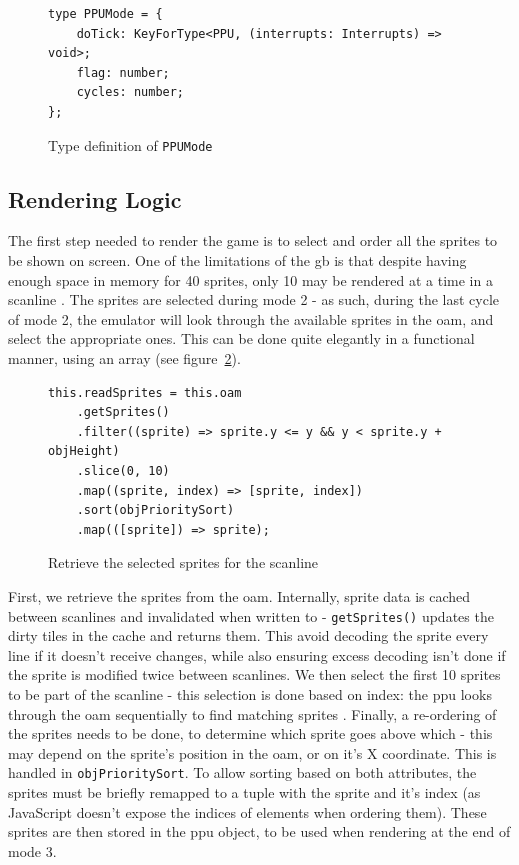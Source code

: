 \documentclass[11pt]{report}
\begin{document}
\begin{figure}[h]
    \begin{verbatim}
type PPUMode = {
    doTick: KeyForType<PPU, (interrupts: Interrupts) => void>;
    flag: number;
    cycles: number;
};
    \end{verbatim}
    \caption{Type definition of \texttt{PPUMode}}
    \label{fig:stat-mode-type}
\end{figure}

\subsection{Rendering Logic}

The first step needed to render the game is to select and order all the sprites to be shown on screen. One of the limitations of the \gls{gb} is that despite having enough space in memory for 40 sprites, only 10 may be rendered at a time in a scanline \cite[OAM]{pandoc}. The sprites are selected during mode 2 - as such, during the last cycle of mode 2, the emulator will look through the available sprites in the \gls{oam}, and select the appropriate ones. This can be done quite elegantly in a functional manner, using an array (see figure~\ref{fig:sprite-select}).

\begin{figure}[h]
    \begin{verbatim}
this.readSprites = this.oam
    .getSprites()
    .filter((sprite) => sprite.y <= y && y < sprite.y + objHeight)
    .slice(0, 10)
    .map((sprite, index) => [sprite, index])
    .sort(objPrioritySort)
    .map(([sprite]) => sprite);
    \end{verbatim}
    \caption{Retrieve the selected sprites for the scanline}
    \label{fig:sprite-select}
\end{figure}

First, we retrieve the sprites from the \gls{oam}. Internally, sprite data is cached between scanlines and invalidated when written to - \texttt{getSprites()} updates the dirty tiles in the cache and returns them. This avoid decoding the sprite every line if it doesn't receive changes, while also ensuring excess decoding isn't done if the sprite is modified twice between scanlines. We then select the first 10 sprites to be part of the scanline - this selection is done based on index: the \gls{ppu} looks through the \gls{oam} sequentially to find matching sprites \cite[OAM]{pandoc}. Finally, a re-ordering of the sprites needs to be done, to determine which sprite goes above which - this may depend on the sprite's position in the \gls{oam}, or on it's X coordinate. This is handled in \texttt{objPrioritySort}. To allow sorting based on both attributes, the sprites must be briefly remapped to a tuple with the sprite and it's index (as JavaScript doesn't expose the indices of elements when ordering them). These sprites are then stored in the \gls{ppu} object, to be used when rendering at the end of mode 3.
\end{document}
